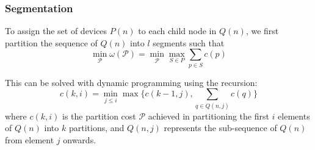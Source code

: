 \documentclass[12pt,aspectratio=169]{beamer}
\begin{document}

    \begin{frame}
        \frametitle{Segmentation}

        To assign the set of devices $P(n)$ to each child node in $Q(n)$, we first partition the sequence of $Q(n)$ into
        $l$ segments such that
        $$
            \min_{\mathcal{P}} \omega(\mathcal{P}) = \min_{\mathcal{P}} \max_{S \in P}\sum_{p \in S}c(p)
        $$

        This can be solved with dynamic programming using the recursion:
        $$
            c(k, i) = \min_{j \leq i} \max\{ c(k-1, j), \sum_{q \in Q(n, j)} c(q) \}
        $$
        where $c(k, i)$ is the partition cost $\mathcal{P}$ achieved in partitioning the first $i$ elements of $Q(n)$
        into $k$ partitions, and $Q(n, j)$ represents the sub-sequence of $Q(n)$ from element $j$ onwards.

    \end{frame}
\end{document}
